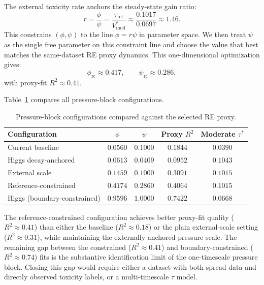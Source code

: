 \documentclass[11pt]{article}
\begin{document}
The external toxicity rate anchors the steady-state gain ratio:
\[
r = \frac{\phi}{\psi} = \frac{\tau_{\mathrm{ref}}}{V^*_{\mathrm{mod}}} \approx \frac{0.1017}{0.0697} \approx 1.46.
\]
This constrains $(\phi, \psi)$ to the line $\phi = r\psi$ in parameter space. We then treat $\psi$ as the single free parameter on this constraint line and choose the value that best matches the same-dataset RE proxy dynamics. This one-dimensional optimization gives:
\[
\phi_{\mathrm{rc}} \approx 0.417, \qquad \psi_{\mathrm{rc}} \approx 0.286,
\]
with proxy-fit $R^2 \approx 0.41$.

Table~\ref{tab:tauconfigs} compares all pressure-block configurations.

\begin{table}[H]
\centering
\caption{Pressure-block configurations compared against the selected RE proxy.}
\label{tab:tauconfigs}
\begin{tabular}{lcccc}
\toprule
Configuration & $\phi$ & $\psi$ & Proxy $R^2$ & Moderate $\tau^*$ \\
\midrule
Current baseline & $0.0560$ & $0.1000$ & $0.1844$ & $0.0390$ \\
Higgs decay-anchored & $0.0613$ & $0.0409$ & $0.0952$ & $0.1043$ \\
External scale & $0.1459$ & $0.1000$ & $0.3091$ & $0.1015$ \\
Reference-constrained & $0.4174$ & $0.2860$ & $0.4064$ & $0.1015$ \\
Higgs (boundary-constrained)\footnotemark & $0.9596$ & $1.0000$ & $0.7422$ & $0.0668$ \\
\bottomrule
\end{tabular}
\end{table}

The reference-constrained configuration achieves better proxy-fit quality ($R^2 \approx 0.41$) than either the baseline ($R^2 \approx 0.18$) or the plain external-scale setting ($R^2 \approx 0.31$), while maintaining the externally anchored pressure scale. The remaining gap between the constrained ($R^2 \approx 0.41$) and boundary-constrained ($R^2 \approx 0.74$) fits is the substantive identification limit of the one-timescale pressure block. Closing this gap would require either a dataset with both spread data and directly observed toxicity labels, or a multi-timescale $\tau$ model.


\end{document}
